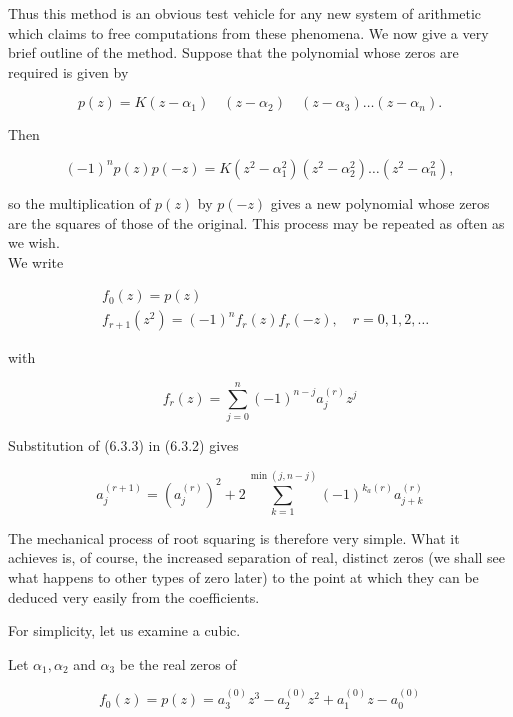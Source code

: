 \documentclass[10pt]{article}
\begin{document}
Thus this method is an obvious test vehicle for any new system of arithmetic which claims to free computations from these phenomena. We now give a very brief outline of the method. Suppose that the polynomial whose zeros are required is given by


\begin{equation*}
p(z)=K\left(z-\alpha_{1}\right) \quad\left(z-\alpha_{2}\right) \quad\left(z-\alpha_{3}\right) \ldots\left(z-\alpha_{n}\right) . \tag{6.3.1}
\end{equation*}


Then

$$
(-1)^{n} p(z) p(-z)=K\left(z^{2}-\alpha_{1}^{2}\right)\left(z^{2}-\alpha_{2}^{2}\right) \ldots\left(z^{2}-\alpha_{n}^{2}\right),
$$

so the multiplication of $p(z)$ by $p(-z)$ gives a new polynomial whose zeros are the squares of those of the original. This process may be repeated as often as we wish.\\
We write


\begin{align*}
& f_{0}(z)=p(z) \\
& f_{r+1}\left(z^{2}\right)=(-1)^{n} f_{r}(z) f_{r}(-z), \quad r=0,1,2, \ldots \tag{6.3.2}
\end{align*}


with


\begin{equation*}
f_{r}(z)=\sum_{j=0}^{n}(-1)^{n-j} a_{j}^{(r)} z^{j} \tag{6.3.3}
\end{equation*}


Substitution of (6.3.3) in (6.3.2) gives


\begin{equation*}
a_{j}^{(r+1)}=\left(a_{j}^{(r)}\right)^{2}+2 \sum_{k=1}^{\min (j, n-j)}(-1)^{k_{a}(r)} a_{j+k}^{(r)} \tag{6.3.4}
\end{equation*}


The mechanical process of root squaring is therefore very simple. What it achieves is, of course, the increased separation of real, distinct zeros (we shall see what happens to other types of zero later) to the point at which they can be deduced very easily from the coefficients.

For simplicity, let us examine a cubic.

Let $\alpha_{1}, \alpha_{2}$ and $\alpha_{3}$ be the real zeros of

$$
f_{0}(z)=p(z)=a_{3}^{(0)} z^{3}-a_{2}^{(0)} z^{2}+a_{1}^{(0)} z-a_{0}^{(0)}
$$
\end{document}
